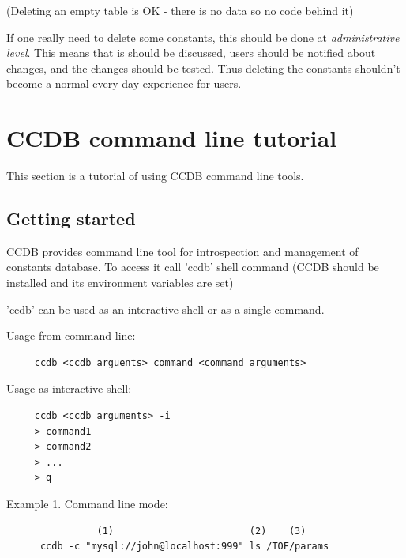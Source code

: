 \documentclass{article}
\begin{document}
(Deleting an empty table is OK - there is no data so no code behind it)


If one really need to delete some constants, this should be done at
\textit{administrative level}. This means that is should be discussed, users
should be notified about changes, and the changes should be tested.
Thus deleting the constants shouldn't become a normal every day experience
for users.

\newpage
\section{CCDB command line tutorial}\label{sec:console_tools_tutorial}

This section is a tutorial of using CCDB command line tools.


\subsection {Getting started}

CCDB provides command line tool for introspection and management of constants
database. To access it call 'ccdb' shell command (CCDB should be installed and 
its environment variables are set)

'ccdb' can be used as an interactive shell or as a single command.
\vspace{1 em}


Usage from command line:
\begin{verbatim}
     ccdb <ccdb arguents> command <command arguments>
\end{verbatim}
\vspace{1 em}

Usage as interactive shell:
\begin{verbatim}
     ccdb <ccdb arguments> -i
     > command1
     > command2
     > ...
     > q
\end{verbatim}
\vspace{1 em}


Example 1. Command line mode:
\begin{verbatim}
                (1)                        (2)    (3)
      ccdb -c "mysql://john@localhost:999" ls /TOF/params

\end{verbatim}
\vspace{1 em}
\end{document}
